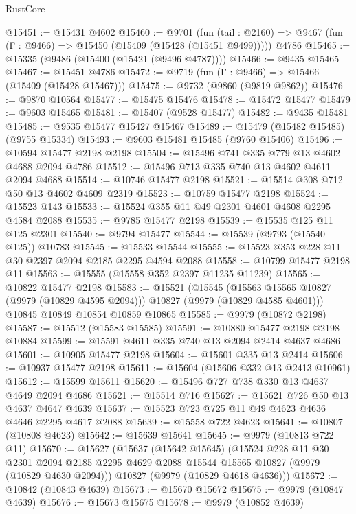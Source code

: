 \begin{lexlean}{RustCore}
\begin{coremodule}
@15451 := @15431 @4602
@15460 := @9701
    (fun (tail : @2160) => @9467 (fun (Γ : @9466) => @15450 (@15409 (@15428 (@15451 @9499)))))
    @4786
@15465 := @15335 (@9486 (@15400 (@15421 (@9496 @4787))))
@15466 := @9435 @15465
@15467 := @15451 @4786
@15472 := @9719 (fun (Γ : @9466) => @15466 (@15409 (@15428 @15467)))
@15475 := @9732 (@9860 (@9819 @9862))
@15476 := @9870 @10564
@15477 := @15475 @15476
@15478 := @15472 @15477
@15479 := @9603 @15465
@15481 := @15407 (@9528 @15477)
@15482 := @9435 @15481
@15485 := @9535 @15477 @15427 @15467
@15489 := @15479 (@15482 @15485) (@9755 @15334)
@15493 := @9603 @15481 @15485 (@9760 @15406)
@15496 := @10594 @15477 @2198 @2198
@15504 := @15496 @741 @335 @779 @13 @4602 @4688 @2094 @4786
@15512 := @15496 @713 @335 @740 @13 @4602 @4611 @2094 @4688
@15514 := @10746 @15477 @2198
@15521 := @15514 @308 @712 @50 @13 @4602 @4609 @2319
@15523 := @10759 @15477 @2198
@15524 := @15523 @143
@15533 := @15524 @355 @11 @49 @2301 @4601 @4608 @2295 @4584 @2088
@15535 := @9785 @15477 @2198
@15539 := @15535 @125 @11 @125 @2301
@15540 := @9794 @15477
@15544 := @15539 (@9793 (@15540 @125)) @10783
@15545 := @15533 @15544
@15555 := @15523 @353 @228 @11 @30 @2397 @2094 @2185 @2295 @4594 @2088
@15558 := @10799 @15477 @2198 @11
@15563 := @15555 (@15558 @352 @2397 @11235 @11239)
@15565 := @10822 @15477 @2198
@15583 := @15521
    (@15545 (@15563 @15565 @10827 (@9979 (@10829 @4595 @2094))) @10827 (@9979 (@10829 @4585 @4601)))
    @10845
    @10849
    @10854
    @10859
    @10865
@15585 := @9979 (@10872 @2198)
@15587 := @15512 (@15583 @15585)
@15591 := @10880 @15477 @2198 @2198 @10884
@15599 := @15591 @4611 @335 @740 @13 @2094 @2414 @4637 @4686
@15601 := @10905 @15477 @2198
@15604 := @15601 @335 @13 @2414
@15606 := @10937 @15477 @2198
@15611 := @15604 (@15606 @332 @13 @2413 @10961)
@15612 := @15599 @15611
@15620 := @15496 @727 @738 @330 @13 @4637 @4649 @2094 @4686
@15621 := @15514 @716
@15627 := @15621 @726 @50 @13 @4637 @4647 @4639
@15637 := @15523 @723 @725 @11 @49 @4623 @4636 @4646 @2295 @4617 @2088
@15639 := @15558 @722 @4623
@15641 := @10807 (@10808 @4623)
@15642 := @15639 @15641
@15645 := @9979 (@10813 @722 @11)
@15670 := @15627
    (@15637
      (@15642 @15645)
      (@15524
        @228
        @11
        @30
        @2301
        @2094
        @2185
        @2295
        @4629
        @2088
        @15544
        @15565
        @10827
        (@9979 (@10829 @4630 @2094)))
      @10827
      (@9979 (@10829 @4618 @4636)))
@15672 := @10842 (@10843 @4639)
@15673 := @15670 @15672
@15675 := @9979 (@10847 @4639)
@15676 := @15673 @15675
@15678 := @9979 (@10852 @4639)

\end{coremodule}
\end{lexlean}

